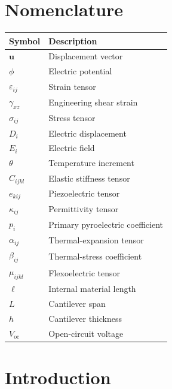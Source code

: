 \documentclass[pdflatex,sn-mathphys-num]{sn-jnl}
\begin{document}
\section*{Nomenclature}
\begin{tabularx}{\linewidth}{@{}lX@{}}
\toprule
\textbf{Symbol} & \textbf{Description}\\
\midrule
$\bm u$ & Displacement vector\\
$\phi$ & Electric potential\\
$\varepsilon_{ij}$ & Strain tensor\\
$\gamma_{xz}$ & Engineering shear strain\\
$\sigma_{ij}$ & Stress tensor\\
$D_i$ & Electric displacement\\
$E_i$ & Electric field\\
$\theta$ & Temperature increment\\
$C_{ijkl}$ & Elastic stiffness tensor\\
$e_{kij}$ & Piezoelectric tensor\\
$\kappa_{ij}$ & Permittivity tensor\\
$p_i$ & Primary pyroelectric coefficient\\
$\alpha_{ij}$ & Thermal-expansion tensor\\
$\beta_{ij}$ & Thermal-stress coefficient\\
$\mu_{ijkl}$ & Flexoelectric tensor\\
$\ell$ & Internal material length\\
$L$ & Cantilever span\\
$h$ & Cantilever thickness\\
$V_{\mathrm{oc}}$ & Open-circuit voltage\\
\bottomrule
\end{tabularx}

\section{Introduction}
\end{document}
